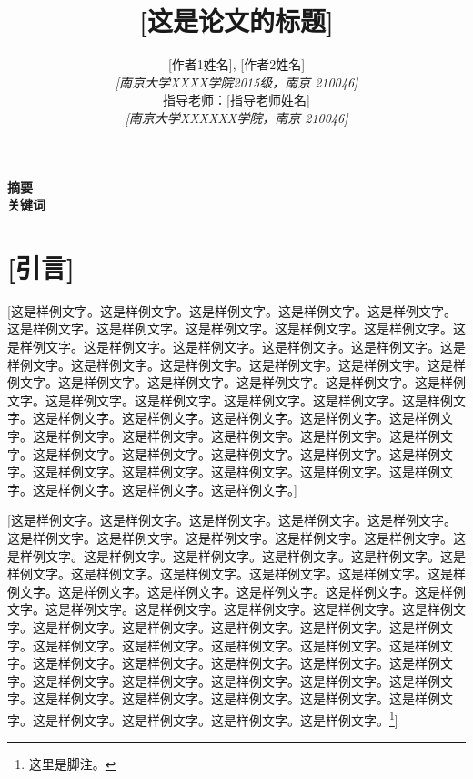\documentclass[a4paper,11pt,onecolumn,twoside]{article}
\title{\textbf{[这是论文的标题]}}
\author{
[作者1姓名], [作者2姓名]
\\[2pt]
{\small \textit{[南京大学XXXX学院2015级，南京 210046]}}\\[6pt]
指导老师：[指导老师姓名]\\[2pt]
{\small \textit{[南京大学XXXXXX学院，南京 210046]}}\\[2pt]
}
\date{}
\begin{document}
\maketitle
\thispagestyle{firststyle}
\setlength{\oddsidemargin}{ 1cm}
\setlength{\evensidemargin}{\oddsidemargin}
\setlength{\textwidth}{15.50cm}
\vspace{-.8cm}
\begin{center}
\parbox{\textwidth}{
\textbf{摘要}  \\

\textbf{关键词}}
\end{center}

\setcounter{page}{1}

\setlength{\oddsidemargin}{-.5cm}  %
\setlength{\evensidemargin}{\oddsidemargin}
\setlength{\textwidth}{17.00cm}

\section*{[引言]}
[这是样例文字。这是样例文字。这是样例文字。这是样例文字。这是样例文字。这是样例文字。这是样例文字。这是样例文字。这是样例文字。这是样例文字。这是样例文字。这是样例文字。这是样例文字。这是样例文字。这是样例文字。这是样例文字。这是样例文字。这是样例文字。这是样例文字。这是样例文字。这是样例文字。这是样例文字。这是样例文字。这是样例文字。这是样例文字。这是样例文字。这是样例文字。这是样例文字。这是样例文字。这是样例文字。这是样例文字。这是样例文字。这是样例文字。这是样例文字。这是样例文字。这是样例文字。这是样例文字。这是样例文字。这是样例文字。这是样例文字。这是样例文字。这是样例文字。这是样例文字。这是样例文字。这是样例文字。这是样例文字。这是样例文字。这是样例文字。这是样例文字。这是样例文字。这是样例文字。这是样例文字。这是样例文字。这是样例文字。]

[这是样例文字。这是样例文字。这是样例文字。这是样例文字。这是样例文字。这是样例文字。这是样例文字。这是样例文字。这是样例文字。这是样例文字。这是样例文字。这是样例文字。这是样例文字。这是样例文字。这是样例文字。这是样例文字。这是样例文字。这是样例文字。这是样例文字。这是样例文字。这是样例文字。这是样例文字。这是样例文字。这是样例文字。这是样例文字。这是样例文字。这是样例文字。这是样例文字。这是样例文字。这是样例文字。这是样例文字。这是样例文字。这是样例文字。这是样例文字。这是样例文字。这是样例文字。这是样例文字。这是样例文字。这是样例文字。这是样例文字。这是样例文字。这是样例文字。这是样例文字。这是样例文字。这是样例文字。这是样例文字。这是样例文字。这是样例文字。这是样例文字。这是样例文字。这是样例文字。这是样例文字。这是样例文字。这是样例文字。这是样例文字。这是样例文字。这是样例文字。这是样例文字。这是样例文字。这是样例文字。\footnote{这里是脚注。}]
\end{document}
